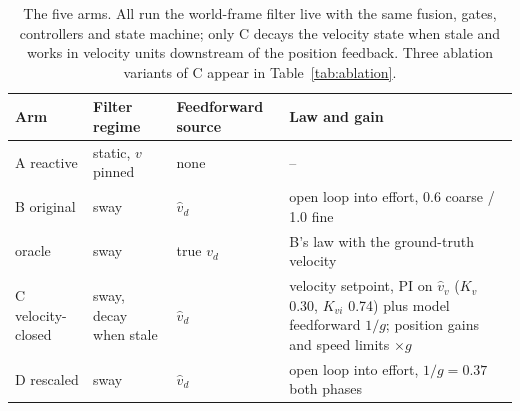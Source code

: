 \begin{table}[t]
  \caption{The five arms. All run the world-frame filter live with the same fusion, gates, controllers and state machine; only C decays the velocity state when stale and works in velocity units downstream of the position feedback. Three ablation variants of C appear in Table~\ref{tab:ablation}.}
  \label{tab:arms}
  \centering
  \footnotesize\setlength{\tabcolsep}{3pt}
  \begin{tabular}{@{}l>{\raggedright\arraybackslash}p{1.6cm}>{\raggedright\arraybackslash}p{1.5cm}>{\raggedright\arraybackslash}p{3.0cm}@{}}
    \toprule
    Arm & Filter regime & Feedforward source & Law and gain \\
    \midrule
    A reactive & static, $v$ pinned & none & -- \\
    B original & sway & $\hat{v}_d$ & open loop into effort, 0.6 coarse / 1.0 fine \\
    \Bgt{} oracle & sway & true $v_d$ & B's law with the ground-truth velocity \\
    C velocity-closed & sway, decay when stale & $\hat{v}_d$ & velocity setpoint, PI on $\hat{v}_v$ ($K_v$ 0.30, $K_{vi}$ 0.74) plus model feedforward $1/g$; position gains and speed limits $\times g$ \\
    D rescaled & sway & $\hat{v}_d$ & open loop into effort, $1/g = 0.37$ both phases \\
    \bottomrule
  \end{tabular}
\end{table}

